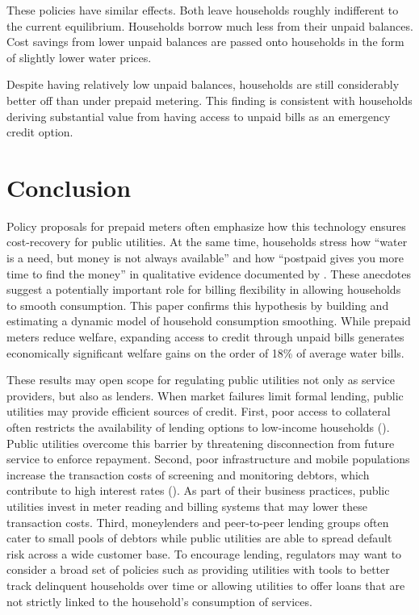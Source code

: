 \documentclass[12pt]{article}
\begin{document}
These policies have similar effects.  Both leave households roughly indifferent to the current equilibrium.  Households borrow much less from their unpaid balances.  Cost savings from lower unpaid balances are passed onto households in the form of slightly lower water prices.  

Despite having relatively low unpaid balances, households are still considerably better off than under prepaid metering.  This finding is consistent with households deriving substantial value from having access to unpaid bills as an emergency credit option.

\section{Conclusion}\label{section:conclusion}

Policy proposals for prepaid meters often emphasize how this technology ensures cost-recovery for public utilities.  At the same time, households stress how ``water is a need, but money is not always available'' and  how ``postpaid gives you more time to find the money'' in qualitative evidence documented by \cite{heymans2014limits}.  These anecdotes suggest a potentially important role for billing flexibility in allowing households to smooth consumption.  This paper confirms this hypothesis by building and estimating a dynamic model of household consumption smoothing.  While prepaid meters reduce welfare, expanding access to credit through unpaid bills generates economically significant welfare gains on the order of 18\% of average water bills.  

These results may open scope for regulating public utilities not only as service providers, but also as lenders.  When market failures limit formal lending, public utilities may provide efficient sources of credit.  First, poor access to collateral often restricts the availability of lending options to low-income households (\cite{jack2016borrowing}).  Public utilities overcome this barrier by threatening disconnection from future service to enforce repayment.  Second, poor infrastructure and mobile populations increase the transaction costs of screening and monitoring debtors, which contribute to high interest rates (\cite{jack2014risk}).  As part of their business practices, public utilities invest in meter reading and billing systems that may lower these transaction costs.  Third, moneylenders and peer-to-peer lending groups often cater to small pools of debtors while public utilities are able to spread default risk across a wide customer base.  To encourage lending, regulators may want to consider a broad set of policies such as providing utilities with tools to better track delinquent households over time or allowing utilities to offer loans that are not strictly linked to the household's consumption of services.  
\end{document}
